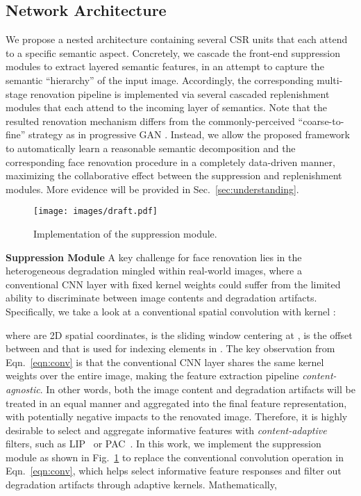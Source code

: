 \documentclass[sigconf]{acmart}
\begin{document}
\subsection{Network Architecture}
\label{sec:architecture}
We propose a nested architecture containing several CSR units that each attend to a specific semantic aspect. Concretely, we cascade the front-end suppression modules to extract layered semantic features, in an attempt to capture the semantic ``hierarchy'' of the input image. Accordingly, the corresponding multi-stage renovation pipeline is implemented via several cascaded replenishment modules that each attend to the incoming layer of semantics.
Note that the resulted renovation mechanism differs from the commonly-perceived ``coarse-to-fine'' strategy as in progressive GAN \cite{progressivegan}\cite{progressive-face-sr}. Instead, we allow the proposed framework to automatically learn a reasonable semantic decomposition and the corresponding face renovation procedure in a completely data-driven manner, maximizing the collaborative effect between the suppression and replenishment modules. More evidence will be provided in Sec.~\ref{sec:understanding}.

\begin{figure}[!tp]
  \centering
  \texttt{[image: images/draft.pdf]}
  \caption{Implementation of the suppression module.}\label{fig:draft}
\end{figure}

\textbf{Suppression Module}
A key challenge for face renovation lies in the heterogeneous degradation mingled within real-world images, where a conventional CNN layer with fixed kernel weights could suffer from the limited ability to discriminate between image contents and degradation artifacts. Specifically, we take a look at a conventional spatial convolution with kernel :



where  are 2D spatial coordinates,  is the sliding window centering at ,  is the offset between  and  that is used for indexing elements in . The key observation from Eqn.~\eqref{eqn:conv} is that the conventional CNN layer shares the same kernel weights over the entire image, making the feature extraction pipeline \emph{content-agnostic}. In other words, both the image content and degradation artifacts will be treated in an equal manner and aggregated into the final feature representation, with potentially negative impacts to the renovated image. Therefore, it is highly desirable to select and aggregate informative features with \emph{content-adaptive} filters, such as LIP~\cite{LIP} or PAC~\cite{PixelAdaptiveCNN}. In this work, we implement the suppression module as shown in Fig.~\ref{fig:draft} to replace the conventional convolution operation in Eqn.~\eqref{eqn:conv}, which helps select informative feature responses and filter out degradation artifacts through adaptive kernels. Mathematically,
\end{document}
